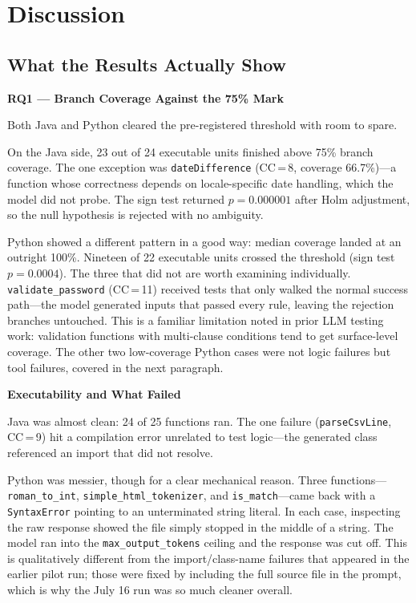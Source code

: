 \section{Discussion}
\label{sec:discussion}

\subsection{What the Results Actually Show}
\label{sec:disc-findings}

\textbf{RQ1 --- Branch Coverage Against the 75\% Mark}

Both Java and Python cleared the pre-registered threshold with room to spare.

On the Java side, 23 out of 24 executable units finished above 75\% branch coverage. The one exception was \texttt{dateDifference} (CC\,=\,8, coverage 66.7\%)---a function whose correctness depends on locale-specific date handling, which the model did not probe. The sign test returned $p = 0.000001$ after Holm adjustment, so the null hypothesis is rejected with no ambiguity.

Python showed a different pattern in a good way: median coverage landed at an outright 100\%. Nineteen of 22 executable units crossed the threshold (sign test $p = 0.0004$). The three that did not are worth examining individually. \texttt{validate\_password} (CC\,=\,11) received tests that only walked the normal success path---the model generated inputs that passed every rule, leaving the rejection branches untouched. This is a familiar limitation noted in prior LLM testing work: validation functions with multi-clause conditions tend to get surface-level coverage. The other two low-coverage Python cases were not logic failures but tool failures, covered in the next paragraph.

\textbf{Executability and What Failed}

Java was almost clean: 24 of 25 functions ran. The one failure (\texttt{parseCsvLine}, CC\,=\,9) hit a compilation error unrelated to test logic---the generated class referenced an import that did not resolve.

Python was messier, though for a clear mechanical reason. Three functions---\texttt{roman\_to\_int}, \texttt{simple\_html\_tokenizer}, and \texttt{is\_match}---came back with a \texttt{SyntaxError} pointing to an unterminated string literal. In each case, inspecting the raw response showed the file simply stopped in the middle of a string. The model ran into the \texttt{max\_output\_tokens} ceiling and the response was cut off. This is qualitatively different from the import/class-name failures that appeared in the earlier pilot run; those were fixed by including the full source file in the prompt, which is why the July 16 run was so much cleaner overall.

